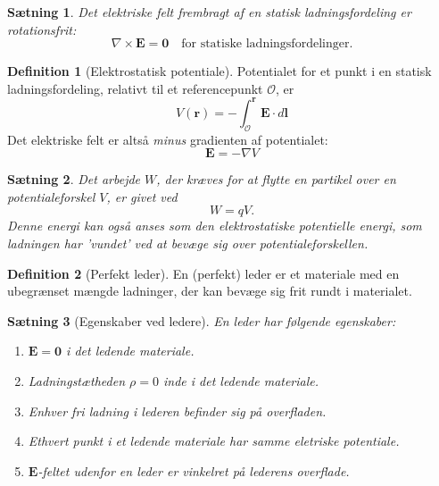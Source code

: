 \documentclass[]{article}
\newtheorem{theorem}{Sætning}
\theoremstyle{definition}
\newtheorem{definition}{Definition}
\begin{document}
\begin{theorem}
	Det elektriske felt frembragt af en statisk ladningsfordeling er rotationsfrit:
	\begin{equation*}
		\nabla \times \mathbf{E} = \mathbf{0} \quad \text{for statiske ladningsfordelinger.}
	\end{equation*}
\end{theorem}

\begin{definition}[Elektrostatisk potentiale]
	Potentialet for et punkt i en statisk ladningsfordeling, relativt til et referencepunkt $\mathcal{O}$, er
	\begin{equation*}
		V(\mathbf{r}) = -\int_\mathcal{O}^{\mathbf{r}} \mathbf{E} \cdot d \mathbf{l}
	\end{equation*}
	Det elektriske felt er altså \emph{minus} gradienten af potentialet:
	\begin{equation*}
		\mathbf{E} = -\nabla V
	\end{equation*}
\end{definition}

\begin{theorem}
	Det arbejde $W$, der kræves for at flytte en partikel over en potentialeforskel $V$, er givet ved
	\begin{equation*}
		W = qV.
	\end{equation*}
	Denne energi kan også anses som den elektrostatiske potentielle energi, som ladningen har 'vundet' ved at bevæge sig over potentialeforskellen.
\end{theorem}

\begin{definition}[Perfekt leder]
	En (perfekt) leder er et materiale med en ubegrænset mængde ladninger, der kan bevæge sig frit rundt i materialet.
\end{definition}

\begin{theorem}[Egenskaber ved ledere]
	En leder har følgende egenskaber:
	\begin{enumerate}
		\item  $\mathbf{E} = \mathbf{0}$ i det ledende materiale.
		\item  Ladningstætheden $\rho = 0$ inde i det ledende materiale.
		\item Enhver fri ladning i lederen befinder sig på overfladen.
		\item Ethvert punkt i et ledende materiale har samme eletriske potentiale.
		\item $\mathbf{E}$-feltet udenfor en leder er vinkelret på lederens overflade.
	\end{enumerate} 
\end{theorem}
\end{document}
